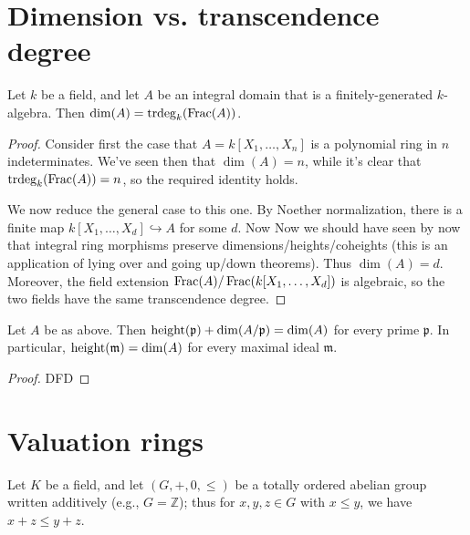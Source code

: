 \documentclass[reqno]{amsart}
\DeclareMathOperator{\trdeg}{trdeg}
\begin{document}
\section{Dimension vs. transcendence degree}
\label{sec:org12a4f19}



\begin{theorem}
Let $k$ be a field,
and let $A$ be an integral domain
that is a finitely-generated $k$-algebra.
Then $\dim( A) = \trdeg_k (\Frac(A))$.
\end{theorem}
\begin{proof}
  Consider first the case
  that $A = k[X_1,\dotsc,X_n]$ is a polynomial ring
  in $n$ indeterminates.
  We've seen then that $\dim(A) = n$,
  while it's clear that $\trdeg_k (\Frac(A)) = n$,
  so the required identity holds.

  We now reduce the general case to this one.  By Noether
  normalization, there is a finite map
  $k[X_1,\dotsc,X_d] \hookrightarrow A$ for some $d$.  Now Now
  we should have seen by now that integral ring morphisms
  preserve dimensions/heights/coheights (this is an application
  of lying over and going up/down theorems).  Thus
  $\dim(A) = d$.  Moreover, the field extension
  $\operatorname{Frac}(A) / \operatorname{Frac}(k[X_1,\dotsc,X_d])$ is algebraic, so the two
  fields have the same transcendence degree.
\end{proof}

\begin{theorem}
  Let $A$ be as above.
  Then $\operatorname{height}(\mathfrak{p}) + \dim(A/\mathfrak{p}) = \dim(A)$
  for every prime $\mathfrak{p}$.
  In particular,
  $\operatorname{height}(\mathfrak{m}) = \dim(A)$ for every maximal ideal $\mathfrak{m}$.
\end{theorem}
\begin{proof}
  DFD
\end{proof}


\section{Valuation rings}
\label{sec:orgd85e6aa}

Let \(K\) be a field,
and let \((G, +, 0, \leq)\) be a totally ordered abelian group written additively
(e.g., \(G = \mathbb{Z}\));
thus for \(x,y,z \in G\) with \(x \leq y\), we have \(x + z \leq y +
  z\).
\end{document}

